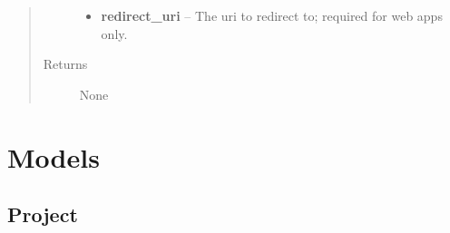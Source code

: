\documentclass[letterpaper,10pt,english]{sphinxmanual}
\begin{document}
\begin{fulllineitems}
\begin{fulllineitems}
\begin{quote}
\begin{description}
\begin{itemize}
\item {} 
\textbf{redirect\_uri} -- The uri to redirect to; required for web apps only.

\end{itemize}

\item[{Returns}] \leavevmode
None

\end{description}\end{quote}

\end{fulllineitems}


\end{fulllineitems}



\section{Models}
\label{Available modules:models}

\subsection{Project}
\label{Available modules:project}
\end{document}
